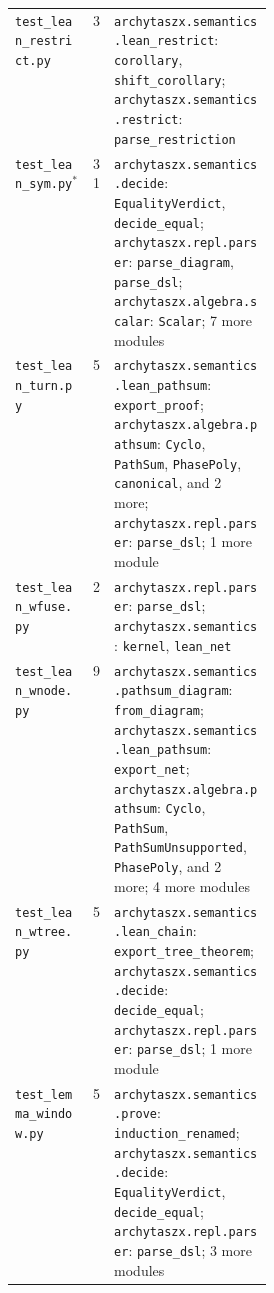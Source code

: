 \begin{xltabular}{\linewidth}{@{}>{\raggedright\arraybackslash}p{0.3\linewidth}r>{\raggedright\arraybackslash}X@{}}
\texttt{test\_\allowbreak{}lean\_\allowbreak{}restrict.py} & 3 & \texttt{archytaszx.\allowbreak{}semantics.\allowbreak{}lean\_\allowbreak{}restrict}: \texttt{corollary}, \texttt{shift\_\allowbreak{}corollary}; \texttt{archytaszx.\allowbreak{}semantics.\allowbreak{}restrict}: \texttt{parse\_\allowbreak{}restriction} \\
\texttt{test\_\allowbreak{}lean\_\allowbreak{}sym.py}$^{\ast}$ & 31 & \texttt{archytaszx.\allowbreak{}semantics.\allowbreak{}decide}: \texttt{EqualityVerdict}, \texttt{decide\_\allowbreak{}equal}; \texttt{archytaszx.\allowbreak{}repl.\allowbreak{}parser}: \texttt{parse\_\allowbreak{}diagram}, \texttt{parse\_\allowbreak{}dsl}; \texttt{archytaszx.\allowbreak{}algebra.\allowbreak{}scalar}: \texttt{Scalar}; 7 more modules \\
\texttt{test\_\allowbreak{}lean\_\allowbreak{}turn.py} & 5 & \texttt{archytaszx.\allowbreak{}semantics.\allowbreak{}lean\_\allowbreak{}pathsum}: \texttt{export\_\allowbreak{}proof}; \texttt{archytaszx.\allowbreak{}algebra.\allowbreak{}pathsum}: \texttt{Cyclo}, \texttt{PathSum}, \texttt{PhasePoly}, \texttt{canonical}, and 2 more; \texttt{archytaszx.\allowbreak{}repl.\allowbreak{}parser}: \texttt{parse\_\allowbreak{}dsl}; 1 more module \\
\texttt{test\_\allowbreak{}lean\_\allowbreak{}wfuse.py} & 2 & \texttt{archytaszx.\allowbreak{}repl.\allowbreak{}parser}: \texttt{parse\_\allowbreak{}dsl}; \texttt{archytaszx.\allowbreak{}semantics}: \texttt{kernel}, \texttt{lean\_\allowbreak{}net} \\
\texttt{test\_\allowbreak{}lean\_\allowbreak{}wnode.py} & 9 & \texttt{archytaszx.\allowbreak{}semantics.\allowbreak{}pathsum\_\allowbreak{}diagram}: \texttt{from\_\allowbreak{}diagram}; \texttt{archytaszx.\allowbreak{}semantics.\allowbreak{}lean\_\allowbreak{}pathsum}: \texttt{export\_\allowbreak{}net}; \texttt{archytaszx.\allowbreak{}algebra.\allowbreak{}pathsum}: \texttt{Cyclo}, \texttt{PathSum}, \texttt{PathSumUnsupported}, \texttt{PhasePoly}, and 2 more; 4 more modules \\
\texttt{test\_\allowbreak{}lean\_\allowbreak{}wtree.py} & 5 & \texttt{archytaszx.\allowbreak{}semantics.\allowbreak{}lean\_\allowbreak{}chain}: \texttt{export\_\allowbreak{}tree\_\allowbreak{}theorem}; \texttt{archytaszx.\allowbreak{}semantics.\allowbreak{}decide}: \texttt{decide\_\allowbreak{}equal}; \texttt{archytaszx.\allowbreak{}repl.\allowbreak{}parser}: \texttt{parse\_\allowbreak{}dsl}; 1 more module \\
\texttt{test\_\allowbreak{}lemma\_\allowbreak{}window.py} & 5 & \texttt{archytaszx.\allowbreak{}semantics.\allowbreak{}prove}: \texttt{induction\_\allowbreak{}renamed}; \texttt{archytaszx.\allowbreak{}semantics.\allowbreak{}decide}: \texttt{EqualityVerdict}, \texttt{decide\_\allowbreak{}equal}; \texttt{archytaszx.\allowbreak{}repl.\allowbreak{}parser}: \texttt{parse\_\allowbreak{}dsl}; 3 more modules \\

\end{xltabular}
